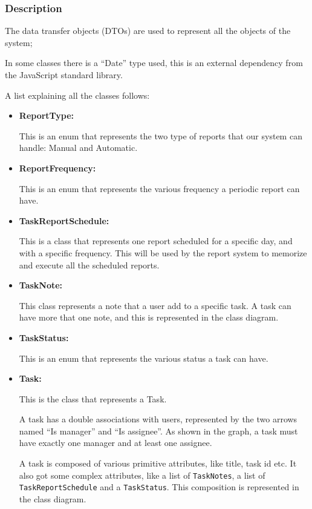 \documentclass{article}
\begin{document}
\subsubsection{Description}

The data transfer objects (DTOs) are used to represent
all the objects of the system;

In some classes there is a ``Date'' type used, this is an external dependency
from the JavaScript standard library.

A list explaining all the classes follows:

\begin{itemize}
    \item \textbf{ReportType: }

    This is an enum that represents the two type of reports that our system can handle: Manual and Automatic.

    \item \textbf{ReportFrequency: }

    This is an enum that represents the various frequency a periodic report can have.

    \item \textbf{TaskReportSchedule: }

    This is a class that represents one report scheduled for a specific day, and with a specific frequency.
    This will be used by the report system to memorize and execute all the scheduled reports.

    \item \textbf{TaskNote: }
    
    This class represents a note that a user add to a specific task.
    A task can have more that one note, and this is represented in the class diagram.

    \item \textbf{TaskStatus: }
    
    This is an enum that represents the various status a task can have.

    \item \textbf{Task: }
    
    This is the class that represents a Task.

    A task has a double associations with users, represented by the two arrows named ``Is manager'' and ``Is assignee''.
    As shown in the graph, a task must have exactly one manager and at least one assignee.

    A task is composed of various primitive attributes, like title, task id etc. 
    It also got some complex attributes, like a list of \texttt{TaskNotes}, a list of \texttt{TaskReportSchedule} 
    and a \texttt{TaskStatus}. This composition is represented in the class diagram. 


\end{itemize}
\end{document}
